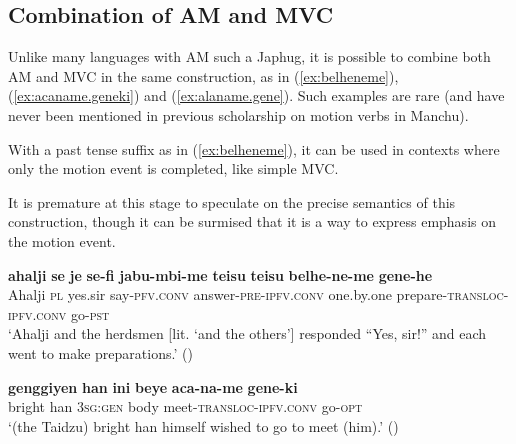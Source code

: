 \documentclass{article}
\newcommand{\ipa}[1]{\textbf{{\phon\mbox{#1}}}} %
\begin{document}
\subsection{Combination of AM and MVC}
Unlike many languages with AM such a Japhug, it is possible to combine both AM and MVC in the same construction, as in (\ref{ex:belheneme}), (\ref{ex:acaname.geneki}) and (\ref{ex:alaname.gene}). Such examples are rare (and have never been mentioned in previous scholarship on motion verbs in Manchu). 

With a past tense suffix as in (\ref{ex:belheneme}), it can be used in contexts where only the motion event is completed, like simple MVC. 

It is premature at this stage to speculate on the precise semantics of this construction, though it can be surmised that it is a way to express emphasis on the motion event.

\begin{exe}
\ex \label{ex:belheneme}
\gll 
\ipa{ahalji} 	\ipa{se} 	\ipa{je} 	\ipa{se-fi} 	\ipa{jabu-mbi-me} 	{\ipa{teisu} \ipa{teisu}} 	\ipa{belhe-ne-me} 	\ipa{gene-he} \\
Ahalji \textsc{pl} yes.sir say-\textsc{pfv.conv} answer-\textsc{pre-ipfv.conv} one.by.one prepare-\textsc{transloc-ipfv.conv} go-\textsc{pst} \\
\glt ‘Ahalji and the herdsmen [lit. ‘and the others’] responded “Yes, sir!” and each went to make preparations.’ (\citealt[14/45]{nowak77nisan})
\end{exe} 



\begin{exe}
\ex \label{ex:acaname.geneki}
\gll
\ipa{genggiyen} 	\ipa{han} 	\ipa{ini} 	\ipa{beye} 	\ipa{aca-na-me} 	\ipa{gene-ki} \\
bright han \textsc{3sg:gen} body meet-\textsc{transloc-ipfv.conv} go-\textsc{opt} \\
\glt ‘(the Taidzu) bright han himself wished to go to meet (him).’ (\citealt[243, 121]{shunjuu92yargiyan})
\end{exe}
\end{document}
